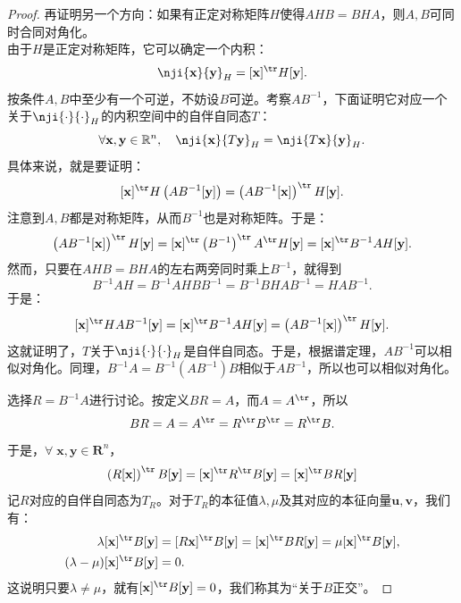 \documentclass[12pt,UTF8]{ctexbook}
\begin{document}
\begin{appendix}
\begin{proof}
    再证明另一个方向：如果有正定对称矩阵$H$使得$AHB=BHA$，则$A,B$可同时合同对角化。\\
    由于$H$是正定对称矩阵，它可以确定一个内积：
    $$\nji{\mathbf{x}}{\mathbf{y}}_H = [\mathbf{x}]^{\tr}H[\mathbf{y}].$$
    按条件$A,B$中至少有一个可逆，不妨设$B$可逆。考察$AB^{-1}$，下面证明它对应一个关于$\nji{\cdot}{\cdot}_H$的内积空间中的自伴自同态$T$：
    $$ \forall \mathbf{x}, \mathbf{y} \in \mathbb{R}^n,\quad \nji{\mathbf{x}}{T\mathbf{y}}_H = \nji{T\mathbf{x}}{\mathbf{y}}_H. $$
    具体来说，就是要证明：
    $$ [\mathbf{x}]^{\tr}H\left(AB^{-1}[\mathbf{y}]\right) = \left(AB^{-1}[\mathbf{x}]\right)^{\tr}H[\mathbf{y}]. $$
    注意到$A,B$都是对称矩阵，从而$B^{-1}$也是对称矩阵。于是：
    \begin{align*}
        \left(AB^{-1}[\mathbf{x}]\right)^{\tr}H[\mathbf{y}] = [\mathbf{x}]^{\tr}\left(B^{-1}\right)^{\tr}A^{\tr}H[\mathbf{y}] = [\mathbf{x}]^{\tr}B^{-1}AH[\mathbf{y}].
    \end{align*}
    然而，只要在$AHB=BHA$的左右两旁同时乘上$B^{-1}$，就得到
    $$ B^{-1}AH = B^{-1}AHBB^{-1} = B^{-1}BHAB^{-1} =  HAB^{-1} .$$
    于是：
    $$ [\mathbf{x}]^{\tr}HAB^{-1}[\mathbf{y}] = [\mathbf{x}]^{\tr}B^{-1}AH[\mathbf{y}] = \left(AB^{-1}[\mathbf{x}]\right)^{\tr}H[\mathbf{y}]. $$
    这就证明了，$T$关于$\nji{\cdot}{\cdot}_H$是自伴自同态。于是，根据谱定理，$AB^{-1}$可以相似对角化。同理，$B^{-1}A = B^{-1}(AB^{-1})B$相似于$AB^{-1}$，所以也可以相似对角化。
    
    选择$R = B^{-1}A$进行讨论。按定义$B R = A$，而$A = A^{\tr}$，所以
    $$
    BR = A = A^{\tr} = R^{\tr} B^{\tr} = R^{\tr} B.
    $$
    于是，$\forall \; \mathbf{x}, \mathbf{y} \in \mathbf{R}^n$，
    $$
    \left(R[\mathbf{x}]\right)^{\tr}B[\mathbf{y}] =  [\mathbf{x}]^{\tr}R^{\tr}B[\mathbf{y}] = [\mathbf{x}]^{\tr}BR[\mathbf{y}] 
    $$
    记$R$对应的自伴自同态为$T_R$。对于$T_R$的本征值$\lambda, \mu$及其对应的本征向量$\mathbf{u}, \mathbf{v}$，我们有：
    \begin{align*}
        \lambda [\mathbf{x}]^{\tr}B[\mathbf{y}] & = [R\mathbf{x}]^{\tr}B[\mathbf{y}] = [\mathbf{x}]^{\tr}BR[\mathbf{y}] = \mu[\mathbf{x}]^{\tr}B[\mathbf{y}], \\
        (\lambda - \mu) [\mathbf{x}]^{\tr}B[\mathbf{y}] &= 0.
    \end{align*}
    这说明只要$\lambda \neq \mu$，就有$[\mathbf{x}]^{\tr}B[\mathbf{y}] = 0$，我们称其为“关于$B$正交”。


\end{proof}
\end{appendix}
\end{document}

